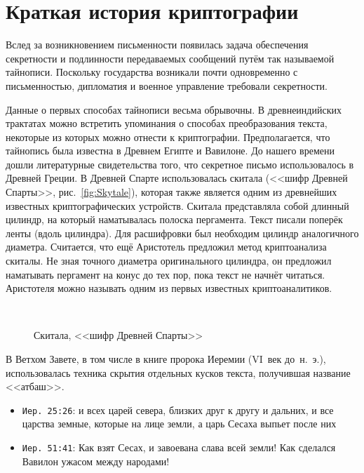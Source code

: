 \chapter{Краткая история криптографии}

Вслед за возникновением письменности появилась задача обеспечения секретности и подлинности передаваемых сообщений путём так называемой тайнописи. Поскольку государства возникали почти одновременно с письменностью, дипломатия и военное управление требовали секретности.

Данные о первых способах тайнописи весьма обрывочны. В древнеиндийских трактатах можно встретить упоминания о способах преобразования текста, некоторые из которых можно отнести к криптографии. Предполагается, что тайнопись была известна в Древнем Египте и Вавилоне. До нашего времени дошли литературные свидетельства того, что секретное письмо использовалось в Древней Греции. В Древней Спарте использовалась скитала (<<шифр Древней Спарты>>, рис.~\ref{fig:Skytale}), которая также является одним из древнейших известных криптографических устройств. Скитала представляла собой длинный цилиндр, на который наматывалась полоска пергамента. Текст писали поперёк ленты (вдоль цилиндра). Для расшифровки был необходим цилиндр аналогичного диаметра. Считается, что ещё Аристотель предложил метод криптоанализа скиталы. Не зная точного диаметра оригинального цилиндра, он предложил наматывать пергамент на конус до тех пор, пока текст не начнёт читаться. Аристотеля можно называть одним из первых известных криптоаналитиков.

\begin{figure}[t]
	\centering
	~~~~
	\caption{Скитала, <<шифр Древней Спарты>>}
\end{figure}

В Ветхом Завете, в том числе в книге пророка Иеремии (VI~век до~н.~э.), использовалась техника скрытия отдельных кусков текста, получившая название <<атбаш>>.

\begin{itemize}
	\item \texttt{Иер. 25:26}: и всех царей севера, близких друг к другу и дальних, и все царства земные, которые на лице земли, а царь Сесаха выпьет после них
	\item \texttt{Иер. 51:41}: Как взят Сесах, и завоевана слава всей земли! Как сделался Вавилон ужасом между народами!
\end{itemize}

